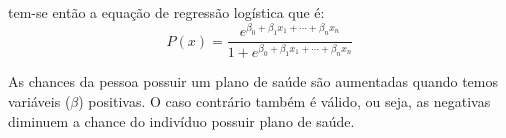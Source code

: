tem-se então a equação de regressão logística que é:
\\
\begin{equation}
    P(x) = \frac{e^{\beta_0 + \beta_1 x_1 +\cdots + \beta_n x_n}}{1 + e^{\beta_0 + \beta_1 x_1 +\cdots + \beta_n x_n}}
\end{equation}

As chances da pessoa possuir um plano de saúde são aumentadas quando temos variáveis ($\beta$) positivas. O caso contrário também é válido, ou seja, as negativas diminuem a chance do indivíduo possuir plano de saúde.
